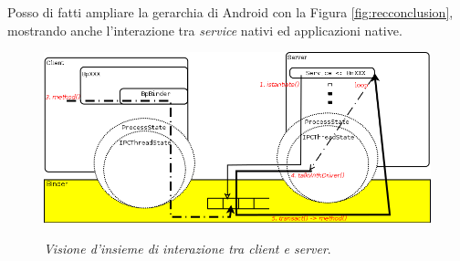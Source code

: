 Posso di fatti ampliare la gerarchia di Android con la Figura 
\vref{fig:recconclusion}, mostrando anche l'interazione tra \textit{service} nativi ed applicazioni
native.

\begin{figure}[!h]
\centering
\includegraphics[scale=0.5]{img/modelio/complintrmodelio.png}\\
\caption{\textit{Visione d'insieme di interazione tra client e server}.}
\label{fig:ipcbindconclusion}
\end{figure}


